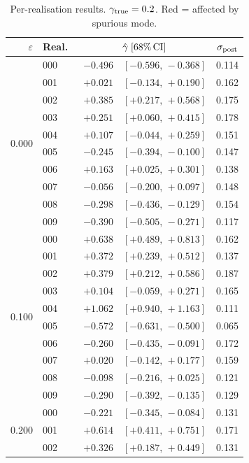 \documentclass[11pt,a4paper]{article}
\begin{document}
\begin{table}[h]
\centering
\caption{Per-realisation results. $\gamma_{\rm true} = 0.2$.
  Red = affected by spurious mode.}
\label{tab:perreal}
\small
\begin{tabular}{r l r@{\,}l r}
\toprule
$\varepsilon$ & Real.\ & \multicolumn{2}{c}{$\hat\gamma\;[68\%\,\rm CI]$} & $\sigma_{\rm post}$ \\
\midrule
\multirow{10}{*}{0.000}
 & 000 & $-0.496$ & $[-0.596,\,-0.368]$ & 0.114 \\
 & 001 & $+0.021$ & $[-0.134,\,+0.190]$ & 0.162 \\
 & 002 & $+0.385$ & $[+0.217,\,+0.568]$ & 0.175 \\
 & 003 & $+0.251$ & $[+0.060,\,+0.415]$ & 0.178 \\
 & 004 & $+0.107$ & $[-0.044,\,+0.259]$ & 0.151 \\
 & 005 & $-0.245$ & $[-0.394,\,-0.100]$ & 0.147 \\
 & 006 & $+0.163$ & $[+0.025,\,+0.301]$ & 0.138 \\
 & 007 & $-0.056$ & $[-0.200,\,+0.097]$ & 0.148 \\
 & 008 & $-0.298$ & $[-0.436,\,-0.129]$ & 0.154 \\
 & 009 & $-0.390$ & $[-0.505,\,-0.271]$ & 0.117 \\
\midrule
\multirow{10}{*}{0.100}
 & 000 & $+0.638$ & $[+0.489,\,+0.813]$ & 0.162 \\
 & 001 & $+0.372$ & $[+0.239,\,+0.512]$ & 0.137 \\
 & 002 & $+0.379$ & $[+0.212,\,+0.586]$ & 0.187 \\
 & 003 & $+0.104$ & $[-0.059,\,+0.271]$ & 0.165 \\
 & 004 & $+1.062$ & $[+0.940,\,+1.163]$ & 0.111 \\
 & 005 & $-0.572$ & $[-0.631,\,-0.500]$ & 0.065 \\
 & 006 & $-0.260$ & $[-0.435,\,-0.091]$ & 0.172 \\
 & 007 & $+0.020$ & $[-0.142,\,+0.177]$ & 0.159 \\
 & 008 & $-0.098$ & $[-0.216,\,+0.025]$ & 0.121 \\
 & 009 & $-0.290$ & $[-0.392,\,-0.135]$ & 0.129 \\
\midrule
\multirow{10}{*}{0.200}
 & 000 & $-0.221$ & $[-0.345,\,-0.084]$ & 0.131 \\
 & 001 & $+0.614$ & $[+0.411,\,+0.751]$ & 0.171 \\
 & 002 & $+0.326$ & $[+0.187,\,+0.449]$ & 0.131 \\

\end{tabular}
\end{table}
\end{document}
